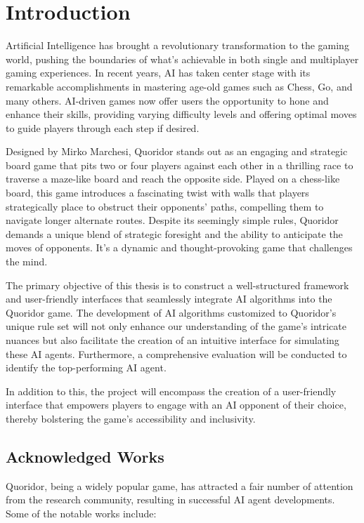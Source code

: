 \chapter*{Introduction}

Artificial Intelligence has brought a revolutionary transformation to the gaming world, pushing the boundaries
of what's achievable in both single and multiplayer gaming experiences. In recent years, AI has taken center
stage with its remarkable accomplishments in mastering age-old games such as Chess, Go, and many others.
AI-driven games now offer users the opportunity to hone and enhance their skills, providing varying difficulty
levels and offering optimal moves to guide players through each step if desired.

Designed by Mirko Marchesi, Quoridor stands out as an engaging and strategic board game that pits two or four
players against each other in a thrilling race to traverse a maze-like board and reach the opposite side.
Played on a chess-like board, this game introduces a fascinating twist with walls that players strategically
place to obstruct their opponents' paths, compelling them to navigate longer alternate routes. Despite its
seemingly simple rules, Quoridor demands a unique blend of strategic foresight and the ability to anticipate
the moves of opponents. It's a dynamic and thought-provoking game that challenges the mind.

The primary objective of this thesis is to construct a well-structured framework and user-friendly interfaces
that seamlessly integrate AI algorithms into the Quoridor game. The development of AI algorithms customized to
Quoridor's unique rule set will not only enhance our understanding of the game's intricate nuances but also
facilitate the creation of an intuitive interface for simulating these AI agents. Furthermore, a comprehensive
evaluation will be conducted to identify the top-performing AI agent.

In addition to this, the project will encompass the creation of a user-friendly interface that empowers players
to engage with an AI opponent of their choice, thereby bolstering the game's accessibility and inclusivity.

\section {Acknowledged Works}

Quoridor, being a widely popular game, has attracted a fair number of attention from the research community,
resulting in successful AI agent developments. Some of the notable works include:

